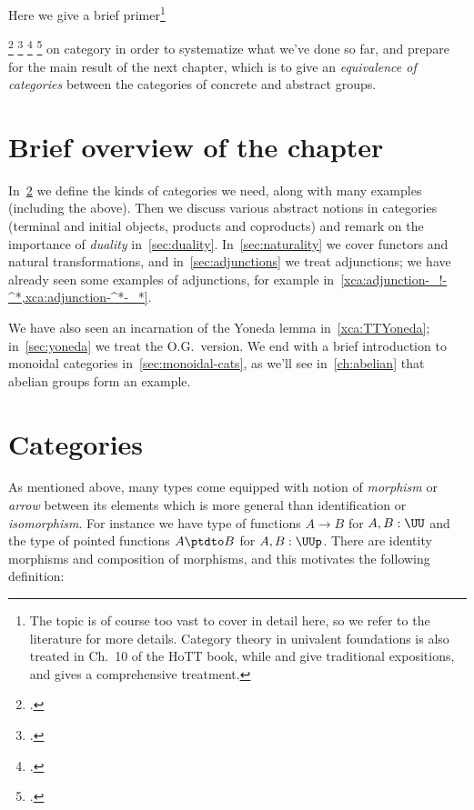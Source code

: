 Here we give a brief primer\footnote{%
  The topic is of course too vast to cover in detail here,
  so we refer to the literature for more details.
  Category theory in univalent foundations is also treated in
  Ch.~10 of the HoTT book\footnotemark{},
  while \citeauthor{AwodeyCat}\footnotemark{}
  and \citeauthor{RiehlContext}\footnotemark{}
  give traditional expositions,
  and \citeauthor{MacLaneWorking}\footnotemark{}
  gives a comprehensive treatment.}%
\addtocounter{footnote}{-3}\footcitetext{hottbook}%
\footcitetext{AwodeyCat}%
\footcitetext{RiehlContext}%
\footcitetext{MacLaneWorking}%
on category in order to systematize what we've done so far,
and prepare for the main result of the next chapter, which is to give an
\emph{equivalence of categories} between the categories of concrete and abstract groups.

\section{Brief overview of the chapter}

In~\cref{sec:categories} we define the kinds of categories we need, along with many examples (including the above).
Then we discuss various abstract notions in categories (terminal and initial objects, products and coproducts)
and remark on the importance of \emph{duality} in~\cref{sec:duality}.
In~\cref{sec:naturality} we cover functors and natural transformations,
and in~\cref{sec:adjunctions} we treat adjunctions;
we have already seen some examples of adjunctions,
for example in~\cref{xca:adjunction-_!-^*,xca:adjunction-^*-_*}.

We have also seen an incarnation of the Yoneda lemma in~\cref{xca:TTYoneda};
in~\cref{sec:yoneda} we treat the O.G.\ version. We end with a brief introduction to monoidal categories in~\cref{sec:monoidal-cats}, as we'll see in~\cref{ch:abelian} that abelian groups form an example.

\section{Categories}
\label{sec:categories}

As mentioned above, many types come equipped with notion
of \emph{morphism} or \emph{arrow} between its elements
which is more general than identification or \emph{isomorphism}.
For instance
we have type of functions $A \to B$ for $A,B:\UU$
and the type of pointed functions $A \ptdto B$ for $A,B:\UUp$.
There are identity morphisms and composition of morphisms,
and this motivates the following definition:

